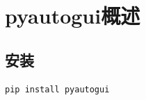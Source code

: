 \chapter{pyautogui概述}
\section{安装}
\begin{lstlisting}[style=demostyle,numbers=none]
pip install pyautogui
\end{lstlisting}